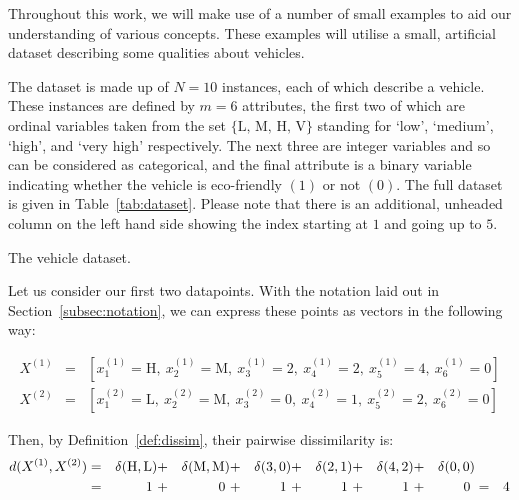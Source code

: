 \begin{example}\label{ex:dissim}
    Throughout this work, we will make use of a number of small examples to aid
    our understanding of various concepts. These examples will utilise a small,
    artificial dataset describing some qualities about vehicles.
    
    The dataset is made up of \(N = 10\) instances, each of which describe a
    vehicle. These instances are defined by \(m = 6\) attributes, the first two
    of which are ordinal variables taken from the set \(\{\text{L, M, H, V}\}\)
    standing for `low', `medium', `high', and `very high' respectively. The
    next three are integer variables and so can be considered as categorical,
    and the final attribute is a binary variable indicating whether the vehicle
    is eco-friendly \((1)\) or not \((0)\). The full dataset is given in
    Table~\ref{tab:dataset}. Please note that there is an additional, unheaded
    column on the left hand side showing the index starting at \(1\) and going
    up to \(5\).
    
    \begin{table}[H]
        \centering
        \singlespacing{%
        \resizebox{.8\textwidth}{!}{%
            \centering
            
        }}
        \caption{The vehicle dataset.}\label{tab:dataset}
    \end{table}

    Let us consider our first two datapoints. With the notation laid out in
    Section~\ref{subsec:notation}, we can express these points as vectors in the
    following way:

    \begin{equation}
        \nonumber
        \begin{aligned}
            X^{(1)} & = & \left[ x_1^{(1)} = \text{H}, \ x_2^{(1)} = \text{M}, \
            x_3^{(1)} = 2, \ x_4^{(1)} = 2, \ x_5^{(1)} = 4, \ x_6^{(1)} = 0 
            \right]
            \\
            X^{(2)} & = & \left[ x_1^{(2)} = \text{L}, \ x_2^{(2)} = \text{M}, \
            x_3^{(2)} = 0, \ x_4^{(2)} = 1, \ x_5^{(2)} = 2, \ x_6^{(2)} = 0
            \right]
        \end{aligned}
    \end{equation}

    Then, by Definition~\ref{def:dissim}, their pairwise dissimilarity is:
    \begin{equation}
        \nonumber
        \begin{aligned}
            \centering
            d(X^{(1)}, X^{(2)}) & = & \delta(\text{H}, \text{L}) & + & 
            \delta(\text{M}, \text{M}) & + & \delta(3, 0) & + & \delta(2, 1) &
            + & \delta(4, 2) & + & \delta(0, 0) & {} & {}
            \\
            {} & = & 1 \ & + & 0 \ & + & 1 \ & + & 1 \ & + & 1 \ & + & 0 \ & = &
            4
        \end{aligned}
    \end{equation}
\end{example}

